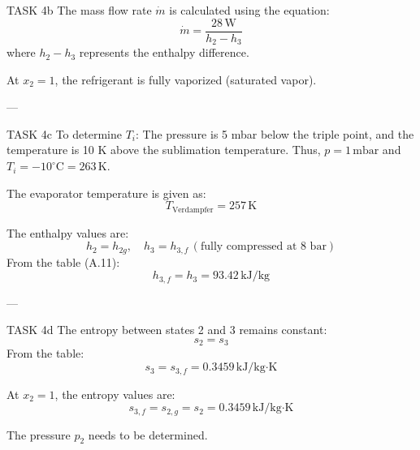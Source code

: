 TASK 4b  
The mass flow rate \( \dot{m} \) is calculated using the equation:  
\[
\dot{m} = \frac{28 \, \text{W}}{h_2 - h_3}
\]  
where \( h_2 - h_3 \) represents the enthalpy difference.  

At \( x_2 = 1 \), the refrigerant is fully vaporized (saturated vapor).  

---

TASK 4c  
To determine \( T_i \):  
The pressure is 5 mbar below the triple point, and the temperature is 10 K above the sublimation temperature.  
Thus, \( p = 1 \, \text{mbar} \) and \( T_i = -10^\circ\text{C} = 263 \, \text{K} \).  

The evaporator temperature is given as:  
\[
T_{\text{Verdampfer}} = 257 \, \text{K}
\]  

The enthalpy values are:  
\[
h_2 = h_{2g}, \quad h_3 = h_{3,f} \, (\text{fully compressed at 8 bar})
\]  
From the table (A.11):  
\[
h_{3,f} = h_3 = 93.42 \, \text{kJ/kg}
\]  

---

TASK 4d  
The entropy between states 2 and 3 remains constant:  
\[
s_2 = s_3
\]  
From the table:  
\[
s_3 = s_{3,f} = 0.3459 \, \text{kJ/kg·K}
\]  

At \( x_2 = 1 \), the entropy values are:  
\[
s_{3,f} = s_{2,g} = s_2 = 0.3459 \, \text{kJ/kg·K}
\]  

The pressure \( p_2 \) needs to be determined.